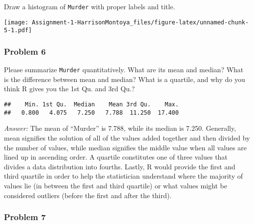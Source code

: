 \documentclass[
]{article}
\newenvironment{Shaded}{\begin{snugshade}}{\end{snugshade}}
\newcommand{\AttributeTok}[1]{\textcolor[rgb]{0.77,0.63,0.00}{#1}}
\newcommand{\FunctionTok}[1]{\textcolor[rgb]{0.00,0.00,0.00}{#1}}
\newcommand{\NormalTok}[1]{#1}
\newcommand{\SpecialCharTok}[1]{\textcolor[rgb]{0.00,0.00,0.00}{#1}}
\newcommand{\StringTok}[1]{\textcolor[rgb]{0.31,0.60,0.02}{#1}}
\begin{document}
Draw a histogram of \texttt{Murder} with proper labels and title.

\begin{Shaded}
\end{Shaded}

\texttt{[image: Assignment-1-HarrisonMontoya\_files/figure-latex/unnamed-chunk-5-1.pdf]}

\hypertarget{problem-6}{%
\subsubsection{Problem 6}\label{problem-6}}

Please summarize \texttt{Murder} quantitatively. What are its mean and
median? What is the difference between mean and median? What is a
quartile, and why do you think R gives you the 1st Qu. and 3rd Qu.?

\begin{Shaded}
\end{Shaded}

\begin{verbatim}
##    Min. 1st Qu.  Median    Mean 3rd Qu.    Max. 
##   0.800   4.075   7.250   7.788  11.250  17.400
\end{verbatim}

\emph{Answer:} The mean of ``Murder'' is 7.788, while its median is
7.250. Generally, mean signifies the solution of all of the values added
together and then divided by the number of values, while median
signifies the middle value when all values are lined up in ascending
order. A quartile constitutes one of three values that divides a data
distribution into fourths. Lastly, R would provide the first and third
quartile in order to help the statistician understand where the majority
of values lie (in between the first and third quartile) or what values
might be considered outliers (before the first and after the third).

\hypertarget{problem-7}{%
\subsubsection{Problem 7}\label{problem-7}}
\end{document}

